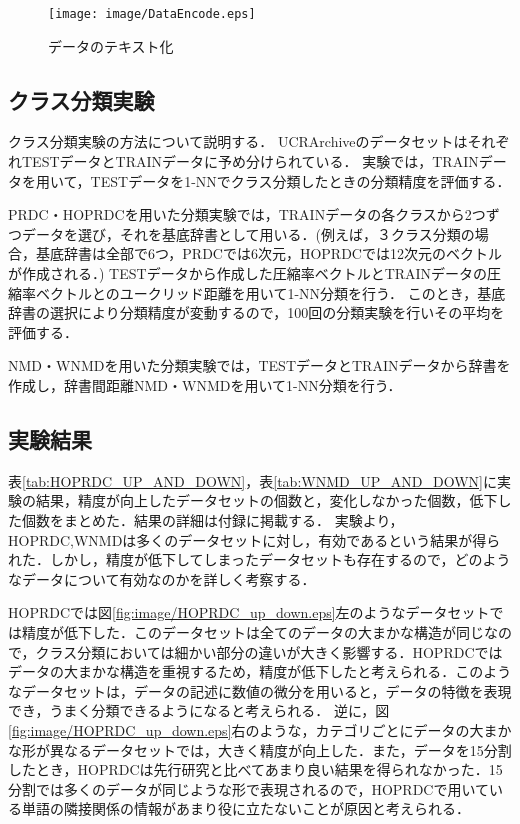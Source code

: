 \begin{figure}[tb]
\begin{center}
\texttt{[image: image/DataEncode.eps]}
\end{center}
\caption{データのテキスト化}
\label{fig:DataEncode.eps}
\end{figure}

\subsection{クラス分類実験} %
\label{sub:クラス分類実験}
クラス分類実験の方法について説明する．
UCRArchiveのデータセットはそれぞれTESTデータとTRAINデータに予め分けられている．
実験では，TRAINデータを用いて，TESTデータを1-NNでクラス分類したときの分類精度を評価する．

PRDC・HOPRDCを用いた分類実験では，TRAINデータの各クラスから2つずつデータを選び，それを基底辞書として用いる．(例えば，３クラス分類の場合，基底辞書は全部で6つ，PRDCでは6次元，HOPRDCでは12次元のベクトルが作成される．)
TESTデータから作成した圧縮率ベクトルとTRAINデータの圧縮率ベクトルとのユークリッド距離を用いて1-NN分類を行う．
このとき，基底辞書の選択により分類精度が変動するので，100回の分類実験を行いその平均を評価する．

NMD・WNMDを用いた分類実験では，TESTデータとTRAINデータから辞書を作成し，辞書間距離NMD・WNMDを用いて1-NN分類を行う．
\subsection{実験結果} %
\label{sub:実験結果}
表\ref{tab:HOPRDC_UP_AND_DOWN}，表\ref{tab:WNMD_UP_AND_DOWN}に実験の結果，精度が向上したデータセットの個数と，変化しなかった個数，低下した個数をまとめた．結果の詳細は付録に掲載する．
実験より，HOPRDC,WNMDは多くのデータセットに対し，有効であるという結果が得られた．しかし，精度が低下してしまったデータセットも存在するので，どのようなデータについて有効なのかを詳しく考察する．

HOPRDCでは図\ref{fig:image/HOPRDC_up_down.eps}左のようなデータセットでは精度が低下した．このデータセットは全てのデータの大まかな構造が同じなので，クラス分類においては細かい部分の違いが大きく影響する．HOPRDCではデータの大まかな構造を重視するため，精度が低下したと考えられる．このようなデータセットは，データの記述に数値の微分を用いると，データの特徴を表現でき，うまく分類できるようになると考えられる．
逆に，図\ref{fig:image/HOPRDC_up_down.eps}右のような，カテゴリごとにデータの大まかな形が異なるデータセットでは，大きく精度が向上した．また，データを15分割したとき，HOPRDCは先行研究と比べてあまり良い結果を得られなかった．15分割では多くのデータが同じような形で表現されるので，HOPRDCで用いている単語の隣接関係の情報があまり役に立たないことが原因と考えられる．

